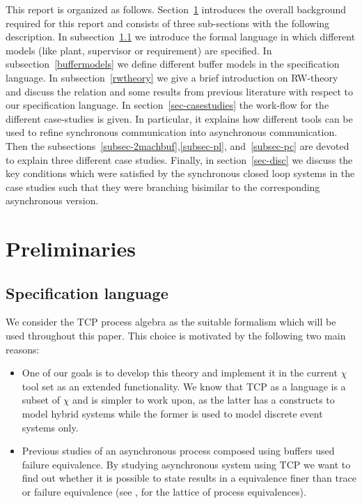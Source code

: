 \documentclass[a4paper,english,final]{article}
\theoremstyle{plain}
\theoremstyle{definition}
\begin{document}
This report is organized as follows. Section~\ref{prelim} introduces the overall background required for this report and consists of three sub-sections with the following description. In subsection~\ref{spec-lang} we introduce the formal language in which different models (like plant, supervisor or requirement) are specified. In subsection~\ref{buffermodels} we define different buffer models in the specification language. In subsection~\ref{rwtheory} we give a brief introduction on RW-theory and discuss the relation and some results from previous literature with respect to our specification language. In section~\ref{sec-casestudies} the work-flow for the different case-studies is given. In particular, it explains how different tools can be used to refine synchronous communication into asynchronous communication. Then the subsections~\ref{subsec-2machbuf},\ref{subsec-pl}, and~\ref{subsec-pc} are devoted to explain three different case studies. Finally, in section~\ref{sec-disc} we discuss the key conditions which were satisfied by the synchronous closed loop systems in the case studies such that they were branching bisimilar to the corresponding asynchronous version.

\section{Preliminaries}\label{prelim}
\subsection{Specification language}\label{spec-lang}
We consider the TCP process algebra \citep{acpbook} as the suitable formalism which will be used throughout this paper. This choice is motivated by the following two main reasons:
\begin{itemize}
\item One of our goals is to develop this theory and implement it in the current $\chi$ \cite{chi} tool set as an extended functionality. We know that TCP as a language is a subset of $\chi$ and is simpler to work upon, as the latter has a constructs to model hybrid systems while the former is used to model discrete event systems only.
\item Previous studies \cite{HHJ90,Fischer96,Pursuit} of an asynchronous process composed using buffers used failure equivalence. By studying asynchronous system using TCP we want to find out whether it is possible to state results in a equivalence finer than trace or failure equivalence (see \citep{Glabeek90}, for the lattice of process equivalences).
\end{itemize}
\end{document}
